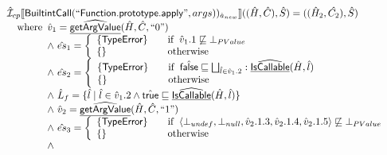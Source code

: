 \[\begin{array}{l}
\aI _{cp}\lbr \SF{BuiltintCall}(``\SF{Function.prototype.apply}",args))_{\hat{a}_{new}}\rbr((\hat{H},\hat{C}), \hat{S})
  = ((\hat{H}_2, \hat{C_2}), \hat{S})\\
\quad\wherec{
  \hat{v}_1 =\ahf{getArgValue}(\hat{H}, \hat{C}, ``0")\\
  \land\ \hat{es}_1 =
    \left\{
    \begin{array}{l@{\quad\quad}l}
      \{ \SF{TypeError} \} & \ifc{\hat{v}_1.1 \not\sqsubseteq \bot_{PValue}}\\
      \{ \}& \owc\\
    \end{array}
    \right.\\
  \land\ \hat{es}_2 =
    \left\{
    \begin{array}{l@{\quad\quad}l}
      \{ \SF{TypeError} \}
      & \ifc{\afalse \sqsubseteq \bigsqcup_{\hat{l}\in\hat{v}_1.2}:\ahf{IsCallable}(\hat{H}, \hat{l})}\\
      \{ \}& \owc\\
    \end{array}
    \right.\\
  \land\ \hat{L}_{f} = \{ \hat{l} \mid \hat{l} \in \hat{v}_1.2 \land \atrue \sqsubseteq \ahf{IsCallable}(\hat{H}, \hat{l})\}\\
  \land\ \hat{v}_2 =\ahf{getArgValue}(\hat{H}, \hat{C}, ``1")\\
  \land\ \hat{es}_3 =
    \left\{
    \begin{array}{l@{\quad\quad}l}
      \{ \SF{TypeError} \}
      & \ifc{\langle\bot_{undef}, \bot_{null}, \hat{v}_2.1.3, \hat{v}_2.1.4, \hat{v}_2.1.5\rangle \not\sqsubseteq \bot_{PValue}}\\
      \{ \}& \owc\\
    \end{array}
    \right.\\
  \land
  }\\
\end{array}
\]


